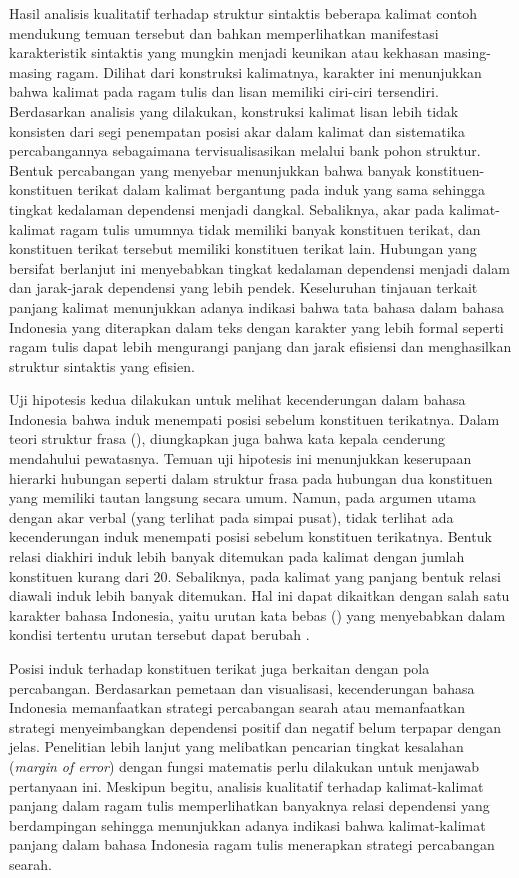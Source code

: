Hasil analisis kualitatif terhadap struktur sintaktis beberapa kalimat contoh mendukung temuan tersebut dan bahkan memperlihatkan manifestasi karakteristik sintaktis yang mungkin menjadi keunikan atau kekhasan masing-masing ragam. Dilihat dari konstruksi kalimatnya, karakter ini menunjukkan bahwa kalimat pada ragam tulis dan lisan memiliki ciri-ciri tersendiri. Berdasarkan analisis yang dilakukan, konstruksi kalimat lisan lebih tidak konsisten dari segi penempatan posisi akar dalam kalimat dan sistematika percabangannya sebagaimana tervisualisasikan melalui bank pohon struktur. Bentuk percabangan yang menyebar menunjukkan bahwa banyak konstituen-konstituen terikat dalam kalimat bergantung pada induk yang sama sehingga tingkat kedalaman dependensi menjadi dangkal. Sebaliknya, akar pada kalimat-kalimat ragam tulis umumnya tidak memiliki banyak konstituen terikat, dan konstituen terikat tersebut memiliki konstituen terikat lain. Hubungan yang bersifat berlanjut ini menyebabkan tingkat kedalaman dependensi menjadi dalam dan jarak-jarak dependensi yang lebih pendek. Keseluruhan tinjauan terkait panjang kalimat menunjukkan adanya indikasi bahwa tata bahasa dalam bahasa Indonesia yang diterapkan dalam teks dengan karakter yang lebih formal seperti ragam tulis dapat lebih mengurangi panjang dan jarak efisiensi dan menghasilkan struktur sintaktis yang efisien. 

Uji hipotesis kedua dilakukan untuk melihat kecenderungan dalam bahasa Indonesia bahwa induk menempati posisi sebelum konstituen terikatnya. Dalam teori struktur frasa (\citealp{sneddon2010indonesian, kridalaksana2002struktur}), diungkapkan juga bahwa kata kepala cenderung mendahului pewatasnya. Temuan uji hipotesis ini menunjukkan keserupaan hierarki hubungan seperti dalam struktur frasa pada hubungan dua konstituen yang memiliki tautan langsung secara umum. Namun, pada argumen utama dengan akar verbal (yang terlihat pada simpai pusat), tidak terlihat ada kecenderungan induk menempati posisi sebelum konstituen terikatnya. Bentuk relasi diakhiri induk lebih banyak ditemukan pada kalimat dengan jumlah konstituen kurang dari 20. Sebaliknya, pada kalimat yang panjang bentuk relasi diawali induk lebih banyak ditemukan. Hal ini dapat dikaitkan dengan salah satu karakter bahasa Indonesia, yaitu urutan kata bebas (\citealp{stack2005word, postman2004processing}) yang menyebabkan dalam kondisi tertentu urutan tersebut dapat berubah \citep[pp. 209-268]{sneddon2010indonesian}. 

Posisi induk terhadap konstituen terikat juga berkaitan dengan pola percabangan. Berdasarkan pemetaan dan visualisasi, kecenderungan bahasa Indonesia memanfaatkan strategi percabangan searah atau memanfaatkan strategi menyeimbangkan dependensi positif dan negatif belum terpapar dengan jelas. Penelitian lebih lanjut yang melibatkan pencarian tingkat kesalahan (\textit{margin of error}) dengan fungsi matematis perlu dilakukan untuk menjawab pertanyaan ini. Meskipun begitu, analisis kualitatif terhadap kalimat-kalimat panjang dalam ragam tulis memperlihatkan banyaknya relasi dependensi yang berdampingan sehingga menunjukkan adanya indikasi bahwa kalimat-kalimat panjang dalam bahasa Indonesia ragam tulis menerapkan strategi percabangan searah.

